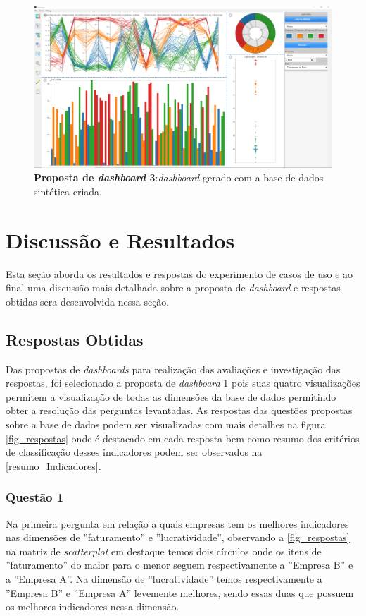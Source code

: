 \documentclass[
	12pt,				%
	openright,			%
	oneside,			%
	a4paper,			%
	english,			%
	brazil				%
	]{abntex2}
\begin{document}
\begin{itemize}
      \begin{figure}[h]
	    \caption{\label{fig_dash3} \textbf{Proposta de \textit{dashboard} 3}:\textit{dashboard} gerado com a base de dados sintética criada.
        }
	\begin{center}
	    \includegraphics[width=\textwidth]{figures/dash3.png}
	\end{center}
    \end{figure}


\end{itemize}

\chapter{Discussão e Resultados}
\label{ch:resultados}
Esta seção aborda os resultados e respostas do experimento de casos de uso e ao final uma discussão mais detalhada sobre a proposta de \textit{dashboard} e respostas obtidas sera desenvolvida nessa seção.

\section{Respostas Obtidas}
Das propostas de \textit{dashboards} para realização das avaliações e investigação das respostas, foi selecionado a proposta de \textit{dashboard} 1 pois suas quatro visualizações permitem a visualização de todas as dimensões da base de dados permitindo obter a resolução das perguntas levantadas.
As respostas das questões propostas sobre a base de dados podem ser visualizadas com mais detalhes na figura \autoref{fig_respostas} onde é destacado em cada resposta bem como resumo dos critérios de classificação desses indicadores podem ser observados na \autoref{resumo_Indicadores}.

\subsection{Questão 1}
 Na primeira pergunta em relação a quais empresas tem os melhores indicadores nas dimensões de ''faturamento'' e ''lucratividade'', observando a \autoref{fig_respostas} na matriz de \textit{scatterplot} em destaque temos dois círculos onde os itens de ''faturamento'' do maior para o menor seguem respectivamente a ''Empresa B'' e a ''Empresa A''. Na dimensão de ''lucratividade'' temos respectivamente a ''Empresa B'' e ''Empresa A'' levemente melhores, sendo essas duas que possuem os melhores indicadores nessa dimensão.
\end{document}
